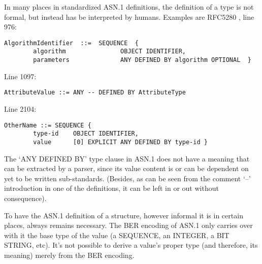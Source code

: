 
In many places in standardized ASN.1 definitions, the definition of a type 
is not formal, but instead has be interpreted by humans. Examples are 
RFC5280 \cite{bib:cert}, line 976:

\begin{changemargin}{-60mm}{0mm}
\begin{myquote}
\begin{verbatim}
AlgorithmIdentifier  ::=  SEQUENCE  {
        algorithm               OBJECT IDENTIFIER,
        parameters              ANY DEFINED BY algorithm OPTIONAL  }
\end{verbatim}
\end{myquote}
\end{changemargin}

Line 1097:

\begin{changemargin}{-60mm}{0mm}
\begin{myquote}
\begin{verbatim}
AttributeValue ::= ANY -- DEFINED BY AttributeType
\end{verbatim}
\end{myquote}
\end{changemargin}

Line 2104:

\begin{changemargin}{-60mm}{0mm}
\begin{myquote}
\begin{verbatim}
OtherName ::= SEQUENCE {
        type-id    OBJECT IDENTIFIER,
        value      [0] EXPLICIT ANY DEFINED BY type-id }
\end{verbatim}
\end{myquote}
\end{changemargin}

The ‘ANY DEFINED BY’ type clause in ASN.1 does not have a meaning that
can be extracted by a parser, since its value content is or can be
dependent on yet to be written sub-standards.
(Besides, as can be seen from the comment ‘--’ introduction in one
of the definitions, it can be left in or out without consequence).


To have the ASN.1 definition of a structure, however informal it is in 
certain places, always remains necessary. The BER encoding of ASN.1 only 
carries over with it the base type of the value (a SEQUENCE, an INTEGER, a 
BIT STRING, etc). It’s not possible to derive a value’s proper type 
(and therefore, its meaning) merely from the BER encoding.

